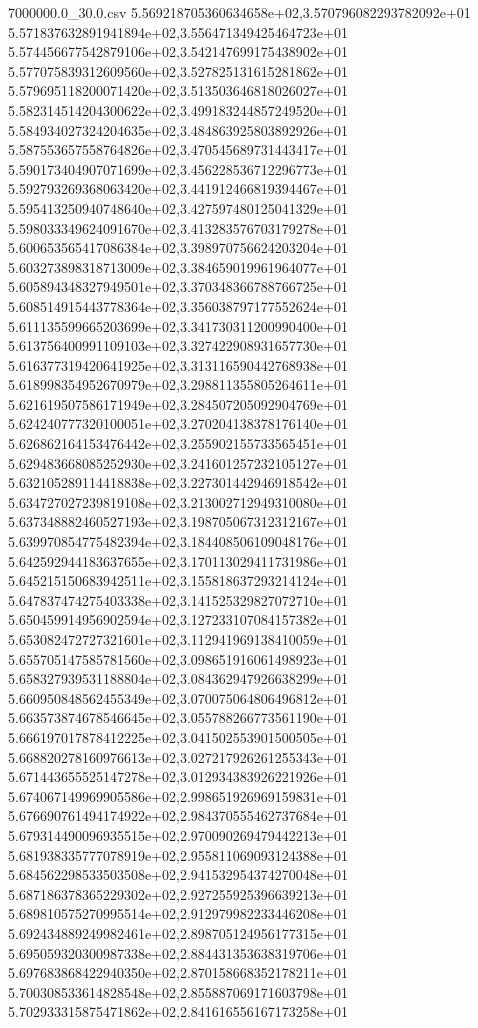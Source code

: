 \begin{filecontents*}{7000000.0_30.0.csv}
5.569218705360634658e+02,3.570796082293782092e+01
5.571837632891941894e+02,3.556471349425464723e+01
5.574456677542879106e+02,3.542147699175438902e+01
5.577075839312609560e+02,3.527825131615281862e+01
5.579695118200071420e+02,3.513503646818026027e+01
5.582314514204300622e+02,3.499183244857249520e+01
5.584934027324204635e+02,3.484863925803892926e+01
5.587553657558764826e+02,3.470545689731443417e+01
5.590173404907071699e+02,3.456228536712296773e+01
5.592793269368063420e+02,3.441912466819394467e+01
5.595413250940748640e+02,3.427597480125041329e+01
5.598033349624091670e+02,3.413283576703179278e+01
5.600653565417086384e+02,3.398970756624203204e+01
5.603273898318713009e+02,3.384659019961964077e+01
5.605894348327949501e+02,3.370348366788766725e+01
5.608514915443778364e+02,3.356038797177552624e+01
5.611135599665203699e+02,3.341730311200990400e+01
5.613756400991109103e+02,3.327422908931657730e+01
5.616377319420641925e+02,3.313116590442768938e+01
5.618998354952670979e+02,3.298811355805264611e+01
5.621619507586171949e+02,3.284507205092904769e+01
5.624240777320100051e+02,3.270204138378176140e+01
5.626862164153476442e+02,3.255902155733565451e+01
5.629483668085252930e+02,3.241601257232105127e+01
5.632105289114418838e+02,3.227301442946918542e+01
5.634727027239819108e+02,3.213002712949310080e+01
5.637348882460527193e+02,3.198705067312312167e+01
5.639970854775482394e+02,3.184408506109048176e+01
5.642592944183637655e+02,3.170113029411731986e+01
5.645215150683942511e+02,3.155818637293214124e+01
5.647837474275403338e+02,3.141525329827072710e+01
5.650459914956902594e+02,3.127233107084157382e+01
5.653082472727321601e+02,3.112941969138410059e+01
5.655705147585781560e+02,3.098651916061498923e+01
5.658327939531188804e+02,3.084362947926638299e+01
5.660950848562455349e+02,3.070075064806496812e+01
5.663573874678546645e+02,3.055788266773561190e+01
5.666197017878412225e+02,3.041502553901500505e+01
5.668820278160976613e+02,3.027217926261255343e+01
5.671443655525147278e+02,3.012934383926221926e+01
5.674067149969905586e+02,2.998651926969159831e+01
5.676690761494174922e+02,2.984370555462737684e+01
5.679314490096935515e+02,2.970090269479442213e+01
5.681938335777078919e+02,2.955811069093124388e+01
5.684562298533503508e+02,2.941532954374270048e+01
5.687186378365229302e+02,2.927255925396639213e+01
5.689810575270995514e+02,2.912979982233446208e+01
5.692434889249982461e+02,2.898705124956177315e+01
5.695059320300987338e+02,2.884431353638319706e+01
5.697683868422940350e+02,2.870158668352178211e+01
5.700308533614828548e+02,2.855887069171603798e+01
5.702933315875471862e+02,2.841616556167173258e+01

\end{filecontents*}
